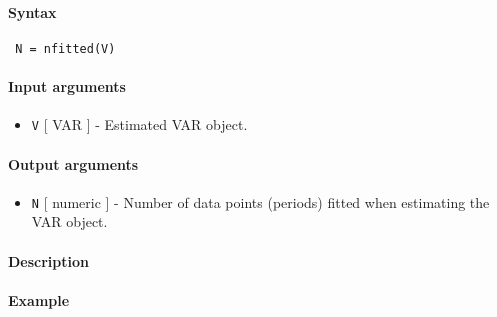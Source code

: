 


	\paragraph{Syntax}
 
 \begin{verbatim}
 N = nfitted(V)
 \end{verbatim}
 
 \paragraph{Input arguments}
 
 \begin{itemize}
 \item
   \texttt{V} {[} VAR {]} - Estimated VAR object.
 \end{itemize}
 
 \paragraph{Output arguments}
 
 \begin{itemize}
 \item
   \texttt{N} {[} numeric {]} - Number of data points (periods) fitted
   when estimating the VAR object.
 \end{itemize}
 
 \paragraph{Description}
 
 \paragraph{Example}


